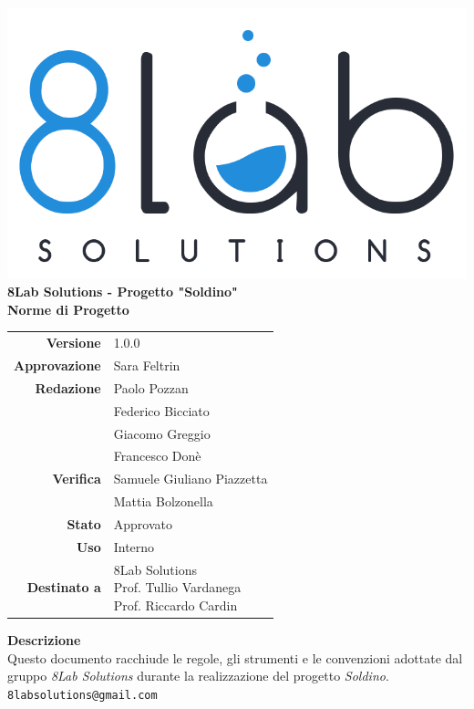 \thispagestyle{empty}
\begin{titlepage}
	\begin{center}
		\includegraphics[scale = 0.3]{res/images/logo8_crop.png}\\
		\large \textbf{8Lab Solutions - Progetto "Soldino"} \\
		\vfill
		\Huge \textbf{Norme di Progetto}
		\vspace*{\fill} 
        \vfill
        \large
        \begin{tabular}{r|l}
                        \textbf{Versione} & 1.0.0\\
                        \textbf{Approvazione} & Sara Feltrin\\
                        \textbf{Redazione} & Paolo Pozzan\\&
                        	Federico Bicciato\\&
                        	Giacomo Greggio\\&
                        	Francesco Donè\\
                        \textbf{Verifica} & 
                        Samuele Giuliano Piazzetta\\&
                        Mattia Bolzonella\\
                        \textbf{Stato} & Approvato\\
                        \textbf{Uso} & Interno\\
                        \textbf{Destinato a} & \parbox[t]{5cm}{8Lab Solutions\\Prof. Tullio Vardanega\\Prof. Riccardo Cardin}
                \end{tabular}
                \vfill
                \normalsize
                \textbf{Descrizione}\\
                Questo documento racchiude le regole, gli strumenti e le convenzioni adottate dal gruppo \textit{8Lab Solutions} durante la realizzazione del progetto \textit{Soldino}.\\
                \vfill
                \small
                \texttt{8labsolutions@gmail.com}
	\end{center}
\end{titlepage}